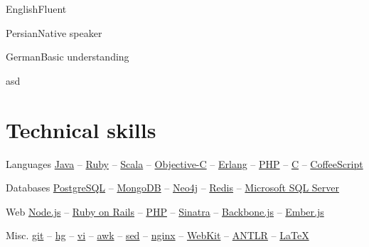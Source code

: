 \documentclass{tccv}
\begin{document}
\begin{factlist}

\item{English}{Fluent}

\item{Persian}{Native speaker}

\item{German}{Basic understanding}



asd


\end{factlist}








\section{Technical skills}

\begin{factlist}

\item{Languages}
     {
     \href{http://www.oracle.com/technetwork/java/}{Java} -- 
     \href{https://www.ruby-lang.org/en/}{Ruby} -- 
     \href{http://www.scala-lang.org}{Scala} -- 
     \href{https://en.wikipedia.org/wiki/Objective-C}{Objective-C} -- 
     \href{http://www.erlang.org}{Erlang} -- 
     \href{http://php.net}{PHP} -- 
     \href{https://en.wikipedia.org/wiki/C_(programming_language)}{C} -- 
     \href{http://coffeescript.org}{CoffeeScript}
     }

\item{Databases}
     {
     \href{http://www.postgresql.org}{PostgreSQL} -- 
     \href{http://www.mongodb.org}{MongoDB} -- 
     \href{http://www.neo4j.org}{Neo4j} -- 
     \href{http://redis.io}{Redis} -- 
     \href{http://www.microsoft.com/en-us/sqlserver/default.aspx}{Microsoft SQL Server}
     }

\item{Web}
     {
     \href{http://nodejs.org}{Node.js} -- 
     \href{http://rubyonrails.org}{Ruby on Rails} -- 
     \href{http://php.net}{PHP} -- 
     \href{http://www.sinatrarb.com}{Sinatra} -- 
     \href{http://backbonejs.org}{Backbone.js} -- 
     \href{http://emberjs.com}{Ember.js}
     }

\item{Misc.}
     {
     \href{http://git-scm.com}{git} -- 
     \href{http://www.selenic.com/mercurial/}{hg} -- 
     \href{http://www.vim.org}{vi} -- 
     \href{http://awk.info}{awk} -- 
     \href{http://www.gnu.org/software/sed/}{sed} -- 
     \href{http://nginx.org/en/}{nginx} -- 
     \href{http://www.webkit.org}{WebKit} -- 
     \href{http://www.antlr.org}{ANTLR} -- 
     \href{http://www.latex-project.org}{\LaTeX}
     }

\end{factlist}
\end{document}
